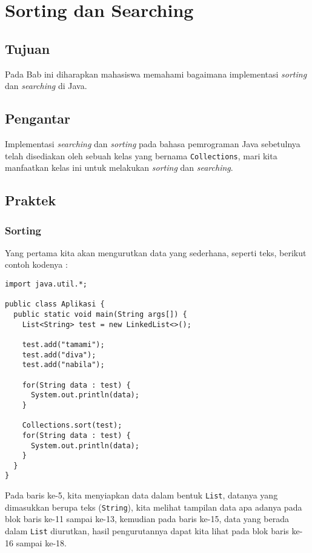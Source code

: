 \chapter{Sorting dan Searching}

\section{Tujuan}

Pada Bab ini diharapkan mahasiswa memahami bagaimana implementasi \textit{sorting} dan \textit{searching} di Java.

\section{Pengantar}

Implementasi \textit{searching} dan \textit{sorting} pada bahasa pemrograman Java sebetulnya telah disediakan oleh sebuah kelas yang bernama \texttt{Collections}, mari kita manfaatkan kelas ini untuk melakukan \textit{sorting} dan \textit{searching}.

\section{Praktek}

\subsection{Sorting}

Yang pertama kita akan mengurutkan data yang sederhana, seperti teks, berikut contoh kodenya :

\begin{lstlisting}
import java.util.*;

public class Aplikasi {
  public static void main(String args[]) {
    List<String> test = new LinkedList<>();

    test.add("tamami");
    test.add("diva");
    test.add("nabila");

    for(String data : test) {
      System.out.println(data);
    }

    Collections.sort(test);
    for(String data : test) {
      System.out.println(data);
    }
  }
}
\end{lstlisting}

Pada baris ke-5, kita menyiapkan data dalam bentuk \texttt{List}, datanya yang dimasukkan berupa teks (\texttt{String}), kita melihat tampilan data apa adanya pada blok baris ke-11 sampai ke-13, kemudian pada baris ke-15, data yang berada dalam \texttt{List} diurutkan, hasil pengurutannya dapat kita lihat pada blok baris ke-16 sampai ke-18.

